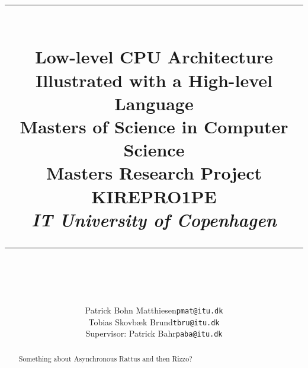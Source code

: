 \documentclass[12pt]{report}
\title{
  \rule{\textwidth}{0.5pt}\\[4mm]
  \huge{\textbf{Low-level CPU Architecture Illustrated with a High-level Language}}\\[2mm]
  \large{Masters of Science in Computer Science}\\
  \large{Masters Research Project}\\
  \large{KIREPRO1PE}\\[4mm]
  \small{\textit{IT University of Copenhagen}}\\
  \rule{\textwidth}{0.5pt}\\
}
\author{
  \begin{tabular}{rr}
  Patrick Bohn Matthiesen & \texttt{pmat@itu.dk} \\
  Tobias Skovbæk Brund & \texttt{tbru@itu.dk} \\
  Supervisor: Patrick Bahr & \texttt{paba@itu.dk} \\
  \end{tabular}
}
\begin{document}
\maketitle
\thispagestyle{empty}
\clearpage

\begin{abstract}
Something about Asynchronous Rattus and then Rizzo?
\end{abstract}
\setcounter{page}{1}
\clearpage

\tableofcontents
\clearpage

\begin{sloppypar}
  \onehalfspacing
  \lstset{style=full}
  \clearpage
  \clearpage
  \clearpage
\end{sloppypar}

\printbibliography[title=References]
\clearpage

\appendix
{}
\lstset{style=appendix}

\end{document}

